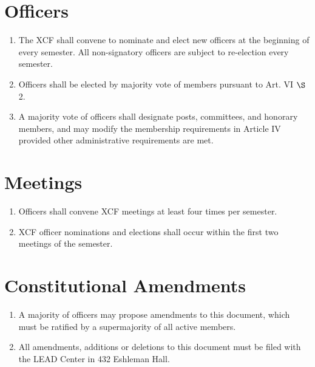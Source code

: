 \documentclass[english,a4paper]{article}
\begin{document}
\section{Officers}

\begin{enumerate}

\item The XCF shall convene to nominate and elect new officers at the beginning of every semester. All non-signatory officers
  are subject to re-election every semester.

\item Officers shall be elected by majority vote of members pursuant to Art. VI $\S$ 2.

\item A majority vote of officers shall designate posts, committees, and
  honorary members, and may modify the membership requirements in Article IV provided other administrative requirements are met.

\end{enumerate}

\section{Meetings}

\begin{enumerate}
\item
  Officers shall convene XCF meetings at least four times per semester.

\item
  XCF officer nominations and elections shall occur within the first
  two meetings of the semester.

\end{enumerate}
\section{Constitutional Amendments}

\begin{enumerate}
\item
  A majority of officers may propose amendments to this document, which must be ratified by a supermajority of all active members.

\item
  All amendments, additions or deletions to this document must be filed with
  the LEAD Center in 432 Eshleman Hall.
\end{enumerate}
\end{document}
